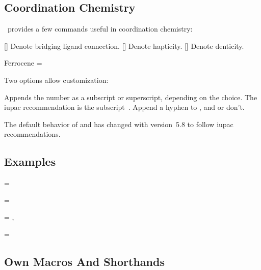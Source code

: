 \documentclass{chemmacros-manual}
\begin{document}
\subsection{Coordination Chemistry}

\chemmacros\ provides a few commands useful in coordination chemistry:
\begin{commands}
  [\quad{}]
    Denote bridging ligand connection.
  [\quad{}]
    Denote hapticity.
  [\quad{}]
    Denote denticity.
\end{commands}
\begin{example}
  Ferrocene =  \par
\end{example}

Two options allow customization:
\begin{options}
    Appends the number as a subscript or superscript, depending on the choice.
    The \ac{iupac} recommendation is the subscript~\cite{iupac:redbook}.
    Append a hyphen to ,  and  or don't.
\end{options}

The default behavior of  and  has
changed with version~5.8 to follow \ac{iupac} recommendations.

\subsection{Examples}
\begin{example}
   =
   \par
   =
   \par
   =
  , \par
   \par
   =
\end{example}

\subsection{Own  Macros And Shorthands}
\end{document}
